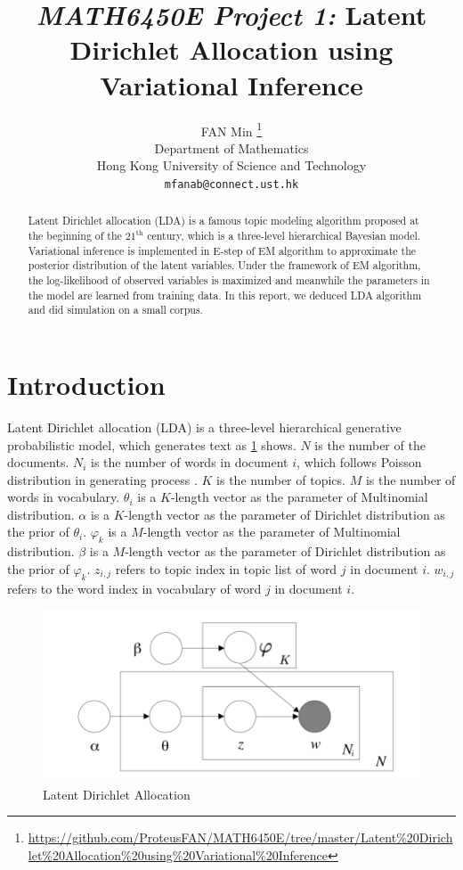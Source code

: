 \documentclass{article}
\title{\emph{MATH6450E Project 1:} Latent Dirichlet Allocation using Variational Inference}
\author{%
  FAN Min
  \thanks{\url{https://github.com/ProteusFAN/MATH6450E/tree/master/Latent\%20Dirichlet\%20Allocation\%20using\%20Variational\%20Inference}} \\
  Department of Mathematics\\
  Hong Kong University of Science and Technology\\
  \texttt{mfanab@connect.ust.hk} \\
}
\begin{document}

\maketitle

\begin{abstract}
   Latent Dirichlet allocation (LDA) is a famous topic modeling algorithm proposed at the beginning of the $ 21^{\mathrm{th}} $ century, which is a three-level hierarchical Bayesian model. Variational inference is implemented in E-step of EM algorithm to approximate the posterior distribution of the latent variables. Under the framework of EM algorithm, the log-likelihood of observed variables is maximized and meanwhile the parameters in the model are learned from training data. In this report, we deduced LDA algorithm and did simulation on a small corpus. 
\end{abstract}

\section{Introduction}

Latent Dirichlet allocation (LDA) is a three-level hierarchical generative probabilistic model, which generates text as \ref{lda} shows. $ N $ is the number of the documents. $ N_{i} $ is the number of words in document $ i $, which follows Poisson distribution in generating process . $ K $ is the number of topics. $ M $ is the number of words in vocabulary. $ \theta_{i} $ is a $ K $-length vector as the parameter of Multinomial distribution. $ \alpha $ is a $ K $-length vector as the parameter of Dirichlet distribution as the prior of $ \theta_{i} $. $ \varphi_{k} $ is a $ M $-length vector as the parameter of Multinomial distribution. $ \beta $ is a $ M $-length vector as the parameter of Dirichlet distribution as the prior of $ \varphi_{k} $. $ z_{i,j} $ refers to topic index in topic list of word $ j $ in document $ i $. $ w_{i,j} $ refers to the word index in vocabulary of word $ j $ in document $ i $.

\begin{figure}[htbp]
	\centering
	\includegraphics[width = 0.7\linewidth]{lda}
	\caption{Latent Dirichlet Allocation}
	\label{lda}
\end{figure}
\end{document}
